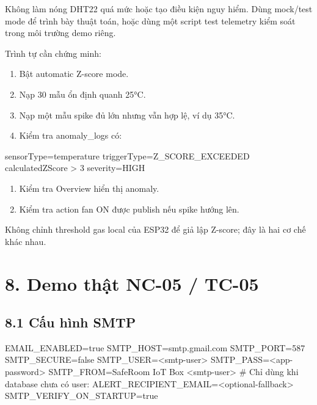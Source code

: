 \documentclass[11pt,oneside,openany]{book}
\renewcommand{\texttt}[1]{{\ttfamily\small #1}}
\newenvironment{Shaded}{\begin{snugshade}}{\end{snugshade}}
\newcommand{\NormalTok}[1]{\textcolor[rgb]{0.81,0.81,0.76}{#1}}
\renewenvironment{Shaded}{%
  \def\FrameCommand{\fboxsep=8pt\colorbox{shadecolor}}%
  \MakeFramed{\advance\hsize-\width\FrameRestore}%
}{\endMakeFramed}
\providecommand{\tightlist}{\setlength{\itemsep}{1pt}\setlength{\parskip}{0pt}}
\begin{document}
Không làm nóng DHT22 quá mức hoặc tạo điều kiện nguy hiểm. Dùng
mock/test mode để trình bày thuật toán, hoặc dùng một script test
telemetry kiểm soát trong môi trường demo riêng.

Trình tự cần chứng minh:

\begin{enumerate}
\def\labelenumi{\arabic{enumi}.}
\tightlist
\item
  Bật automatic Z-score mode.
\item
  Nạp 30 mẫu ổn định quanh 25°C.
\item
  Nạp một mẫu spike đủ lớn nhưng vẫn hợp lệ, ví dụ 35°C.
\item
  Kiểm tra \texttt{anomaly\_logs} có:
\end{enumerate}

\begin{Shaded}
\begin{Highlighting}[]
\NormalTok{sensorType=temperature}
\NormalTok{triggerType=Z\_SCORE\_EXCEEDED}
\NormalTok{calculatedZScore \textgreater{} 3}
\NormalTok{severity=HIGH}
\end{Highlighting}
\end{Shaded}

\begin{enumerate}
\def\labelenumi{\arabic{enumi}.}
\setcounter{enumi}{4}
\tightlist
\item
  Kiểm tra Overview hiển thị anomaly.
\item
  Kiểm tra action fan ON được publish nếu spike hướng lên.
\end{enumerate}

Không chỉnh threshold gas local của ESP32 để giả lập Z-score; đây là hai
cơ chế khác nhau.

\section{8. Demo thật NC-05 /
TC-05}\label{8-demo-thux1eadt-nc-05--tc-05}

\subsection{8.1 Cấu hình SMTP}\label{81-cux1ea5u-huxecnh-smtp}

\begin{Shaded}
\begin{Highlighting}[]
\NormalTok{EMAIL\_ENABLED=true}
\NormalTok{SMTP\_HOST=smtp.gmail.com}
\NormalTok{SMTP\_PORT=587}
\NormalTok{SMTP\_SECURE=false}
\NormalTok{SMTP\_USER=\textless{}smtp{-}user\textgreater{}}
\NormalTok{SMTP\_PASS=\textless{}app{-}password\textgreater{}}
\NormalTok{SMTP\_FROM=SafeRoom IoT Box \textless{}smtp{-}user\textgreater{}}
\NormalTok{\# Chỉ dùng khi database chưa có user:}
\NormalTok{ALERT\_RECIPIENT\_EMAIL=\textless{}optional{-}fallback\textgreater{}}
\NormalTok{SMTP\_VERIFY\_ON\_STARTUP=true}
\end{Highlighting}
\end{Shaded}
\end{document}
